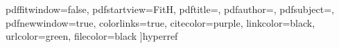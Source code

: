     pdffitwindow=false,     %
    pdfstartview={FitH},    %
    pdftitle={\Title},    	%
    pdfauthor={\Author},    %
    pdfsubject={\Variant},   %
    pdfnewwindow=true,      %
    colorlinks=true,
    citecolor=purple,
    linkcolor=black,      %
    urlcolor=green,
    filecolor=black      %
]{hyperref}
